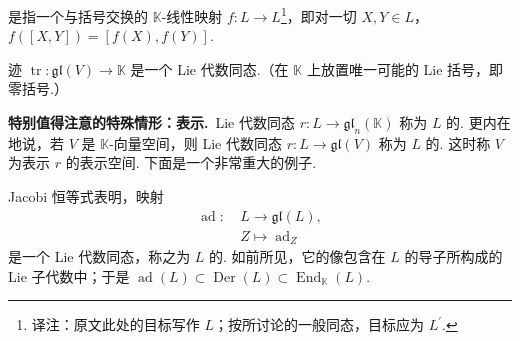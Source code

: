 \begin{definition}\label{def:ssl-1-1-4}
是指一个与括号交换的 $\mathbb{K}$-线性映射 $f\colon L\longrightarrow L$\footnote{译注：原文此处的目标写作 $L$；按所讨论的一般同态，目标应为 $L^{\prime}$.}，即对一切 $X,Y\in L$，$f([X,Y])=[f(X),f(Y)]$.
\end{definition}

\begin{example*}
迹 $\operatorname{tr}\colon\mathfrak{gl}(V)\longrightarrow\mathbb{K}$ 是一个 Lie 代数同态.（在 $\mathbb{K}$ 上放置唯一可能的 Lie 括号，即零括号.）
\end{example*}

\textbf{特别值得注意的特殊情形：表示.}\ Lie 代数同态 $r\colon L\longrightarrow\mathfrak{gl}_n(\mathbb{K})$ 称为 $L$ 的. 更内在地说，若 $V$ 是 $\mathbb{K}$-向量空间，则 Lie 代数同态 $r\colon L\longrightarrow\mathfrak{gl}(V)$ 称为 $L$ 的. 这时称 $V$ 为表示 $r$ 的表示空间. 下面是一个非常重大的例子.

\begin{numpara}\label{np:ssl-1-1-5}
Jacobi 恒等式表明，映射
\[
\begin{aligned}
\operatorname{ad}\colon\ & L\to\mathfrak{gl}(L),\\
& Z\mapsto\operatorname{ad}_Z
\end{aligned}
\]
是一个 Lie 代数同态，称之为 $L$ 的. 如前所见，它的像包含在 $L$ 的导子所构成的 Lie 子代数中；于是 $\operatorname{ad}(L)\subset\operatorname{Der}(L)\subset\operatorname{End}_{\mathbb{K}}(L)$.
\end{numpara}
